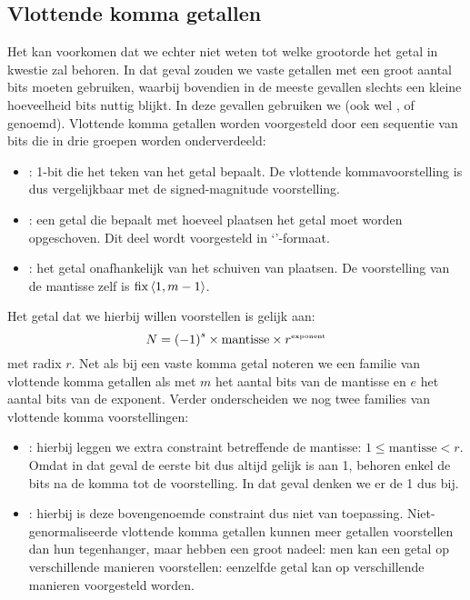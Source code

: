 \subsection{Vlottende komma getallen}
\label{ss:floatingPoints}
Het kan voorkomen dat we echter niet weten tot welke grootorde het getal in kwestie zal behoren. In dat geval zouden we vaste getallen met een groot aantal bits moeten gebruiken, waarbij bovendien in de meeste gevallen slechts een kleine hoeveelheid bits nuttig blijkt. In deze gevallen gebruiken we  (ook wel ,  of  genoemd). Vlottende komma getallen worden voorgesteld door een sequentie van bits die in drie groepen worden onderverdeeld:
\begin{itemize}
 \item {}: 1-bit die het teken van het getal bepaalt. De vlottende kommavoorstelling is dus vergelijkbaar met de signed-magnitude voorstelling.
 \item {}: een getal die bepaalt met hoeveel plaatsen het getal moet worden opgeschoven. Dit deel wordt voorgesteld in `'-formaat.
 \item {}: het getal onafhankelijk van het schuiven van plaatsen. De voorstelling van de mantisse zelf is $\operatorname{fix}\left<1,m-1\right>$.
\end{itemize}
Het getal dat we hierbij willen voorstellen is gelijk aan:
\begin{equation}
N=\left(-1\right)^s\times\mbox{mantisse}\times r^{\mbox{\tiny{exponent}}}
\end{equation}
met radix $r$. Net als bij een vaste komma getal noteren we een familie van vlottende komma getallen als  met $m$ het aantal bits van de mantisse en $e$ het aantal bits van de exponent. Verder onderscheiden we nog twee families van vlottende komma voorstellingen:
\begin{itemize}
 \item {}: hierbij leggen we extra constraint betreffende de mantisse: $1\leq\mbox{mantisse}<r$. Omdat in dat geval de eerste bit dus altijd gelijk is aan 1, behoren enkel de bits na de komma tot de voorstelling. In dat geval denken we er de 1 dus bij.
 \item {}: hierbij is deze bovengenoemde constraint dus niet van toepassing. Niet-genormaliseerde vlottende komma getallen kunnen meer getallen voorstellen dan hun tegenhanger, maar hebben een groot nadeel: men kan een getal op verschillende manieren voorstellen: eenzelfde getal kan op verschillende manieren voorgesteld worden.
\end{itemize}
